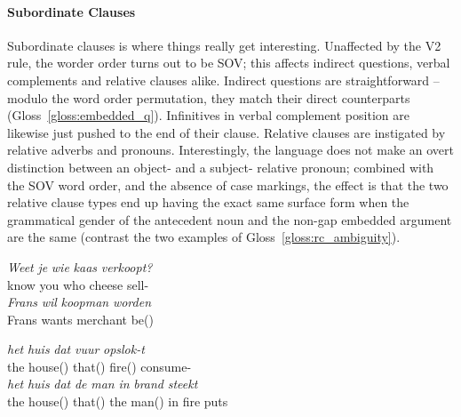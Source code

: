 \paragraph{Subordinate Clauses}
Subordinate clauses is where things really get interesting.
Unaffected by the V2 rule, the worder order turns out to be SOV; this affects indirect questions, verbal complements and relative clauses alike.
Indirect questions are straightforward -- modulo the word order permutation, they match their direct counterparts (Gloss~\ref{gloss:embedded_q}).
Infinitives in verbal complement position are likewise just pushed to the end of their clause.
Relative clauses are instigated by relative adverbs and pronouns.
Interestingly, the language does not make an overt distinction between an object- and a subject- relative pronoun; combined with the SOV word order, and the absence of case markings, the effect is that the two relative clause types end up having the exact same surface form when the grammatical gender of the antecedent noun and the non-gap embedded argument are the same (contrast the two examples of Gloss~\ref{gloss:rc_ambiguity}).

\begin{exe}
\ex\label{gloss:embedded_q}
\gll \textit{Weet} \textit{je} \textit{wie} \textit{kaas} \textit{verkoopt?}\\
know you who cheese sell-\\
\ex\label{gloss:simple_vc}
\gll \textit{Frans} \textit{wil} \textit{koopman} \textit{worden}\\
Frans wants merchant be()\\
\ex\label{gloss:rc_ambiguity}
\begin{xlist}
\ex
\gll \textit{het} \textit{huis} \textit{dat} \textit{vuur} \textit{opslok-t}\\
the house() that() fire() consume-\\
\ex
\gll \textit{het} \textit{huis} \textit{dat} \textit{de} \textit{man} \textit{in} \textit{brand} \textit{steekt}\\
the house() that() the man() in fire puts\\
\end{xlist}
\end{exe}

